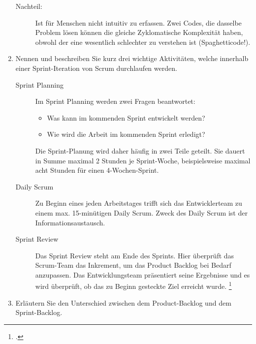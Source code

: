 \documentclass{lehramt-informatik-aufgabe}
\begin{document}
\begin{enumerate}
\begin{liAntwort}
\begin{description}
\item[Nachteil:]

Ist für Menschen nicht intuitiv zu erfassen. Zwei Codes, die dasselbe
Problem lösen können die gleiche Zyklomatische Komplexität haben, obwohl
der eine wesentlich schlechter zu verstehen ist (Spaghetticode!).
\end{description}
\end{liAntwort}


\item Nennen und beschreiben Sie kurz drei wichtige Aktivitäten, welche
innerhalb einer Sprint-Iteration von Scrum durchlaufen werden.

\begin{liAntwort}
\begin{description}
\item[Sprint Planning]

Im Sprint Planning werden zwei Fragen beantwortet:

\begin{itemize}
\item Was kann im kommenden Sprint entwickelt werden?
\item Wie wird die Arbeit im kommenden Sprint erledigt?
\end{itemize}

Die Sprint-Planung wird daher häufig in zwei Teile geteilt. Sie dauert
in Summe maximal 2 Stunden je Sprint-Woche, beispielsweise maximal acht
Stunden für einen 4-Wochen-Sprint.

\item[Daily Scrum]

Zu Beginn eines jeden Arbeitstages trifft sich das Entwicklerteam zu
einem max. 15-minütigen Daily Scrum. Zweck des Daily Scrum ist der
Informationsaustausch.

\item[Sprint Review]

Das Sprint Review steht am Ende des Sprints. Hier überprüft das
Scrum-Team das Inkrement, um das Product Backlog bei Bedarf anzupassen.
Das Entwicklungsteam präsentiert seine Ergebnisse und es wird überprüft,
ob das zu Beginn gesteckte Ziel erreicht wurde.
\footcite{wiki:scrum}
\end{description}
\end{liAntwort}


\item Erläutern Sie den Unterschied zwischen dem Product-Backlog und dem
Sprint-Backlog.


\end{enumerate}
\end{document}
